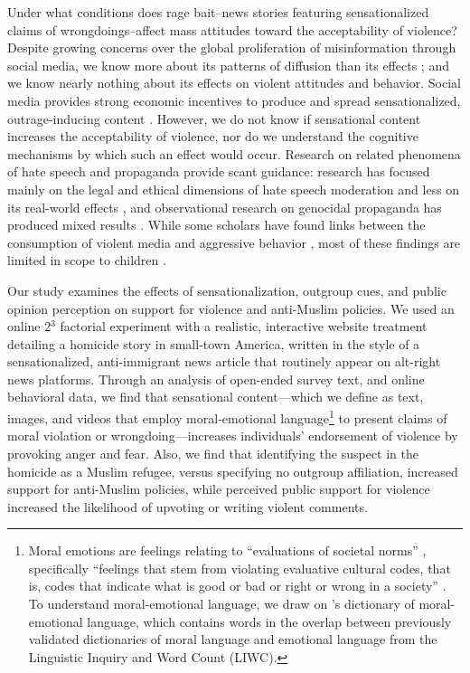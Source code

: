 Under what conditions does rage bait--news stories featuring sensationalized claims of wrongdoings--affect mass attitudes toward the acceptability of violence? Despite growing concerns over the global proliferation of misinformation through social media, we know more about its patterns of diffusion than its effects \citep{brady2017emotion, lazer2018fakenews, vosoughi2018spread}; and we know nearly nothing about its effects on violent attitudes and behavior. Social media provides strong economic incentives to produce and spread sensationalized, outrage-inducing content \citep{crockett2017moral}. However, we do not know if sensational content increases the acceptability of violence, nor do we understand the cognitive mechanisms by which such an effect would occur. Research on related phenomena of hate speech and propaganda provide scant guidance: research has focused mainly on the legal and ethical dimensions of hate speech moderation and less on its real-world effects \citep{gates1996speaking,waldron2012harm}, and observational research on genocidal propaganda has produced mixed results \citep{fujii2004transforming, hagan2008darfur,  straus2007relationship,yanagizawa2014propaganda}. While some scholars have found links between the consumption of violent media and aggressive behavior \citep{kalmoe2014fueling}, most of these findings are limited in scope to children \citep{anderson2003dissociating,drabman1974does,huesmann1994long}. 

Our study examines the effects of sensationalization, outgroup cues, and public opinion perception on support for violence and anti-Muslim policies. We used an online 2$^3$ factorial experiment with a realistic, interactive website treatment detailing a homicide story in small-town America, written in the style of a sensationalized, anti-immigrant news article that routinely appear on alt-right news platforms. Through an analysis of open-ended survey text, and online behavioral data, we find that sensational content---which we define as text, images, and videos that employ moral-emotional language\footnote{Moral emotions are feelings relating to ``evaluations of societal norms'' \citep{brady2017emotion}, specifically ``feelings that stem from violating evaluative cultural codes, that is, codes that indicate what is good or bad or right or wrong in a society'' \citep{stets2012current}. To understand moral-emotional language, we draw on \citep{brady2017emotion}'s dictionary of moral-emotional language, which contains words in the overlap between previously validated dictionaries of moral language and emotional language from the Linguistic Inquiry and Word Count (LIWC).} to present claims of moral violation or wrongdoing---increases individuals' endorsement of violence by provoking anger and fear. Also, we find that identifying the suspect in the homicide as a Muslim refugee, versus specifying no outgroup affiliation, increased support for anti-Muslim policies, while perceived public support for violence increased the likelihood of upvoting or writing violent comments. 

